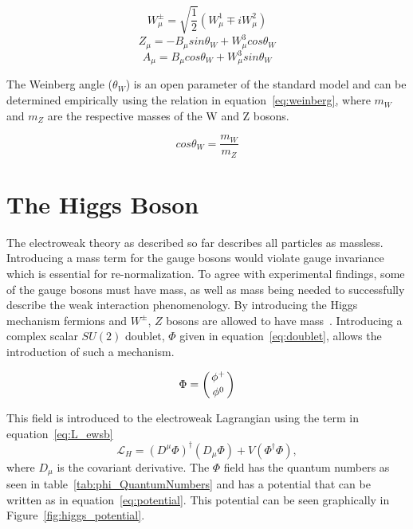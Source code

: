 \begin{equation} W^{\pm}_{\mu} = \sqrt{\dfrac{1}{2}}(W^1_{\mu} \mp iW^2_{\mu}) \label{eq:Ws}\end{equation}
\begin{equation} Z_{\mu} = -B_{\mu} sin \theta_W + W^3_{\mu} cos \theta_W \label{eq:Z}\end{equation}
\begin{equation} A_{\mu} = B_{\mu} cos \theta_W + W^3_{\mu} sin \theta_W \label{eq:gamma}\end{equation}

The Weinberg angle ($\theta_W$) is an open parameter of the standard model and can be determined empirically using the relation in equation~\ref{eq:weinberg}, where $m_W$ and $m_Z$ are the respective masses of the W and Z bosons. 

\begin{equation} cos \theta_W = \dfrac{m_W}{m_Z} \label{eq:weinberg}\end{equation}









\section{The Higgs Boson}

The electroweak theory as described so far describes all particles as massless.  Introducing a mass term for the gauge bosons would violate gauge invariance which is essential for re-normalization.  To agree with experimental findings, some of the gauge bosons must have mass, as well as mass being needed to successfully describe the weak interaction phenomenology. By introducing the Higgs mechanism fermions and $W^{\pm}$, $Z$ bosons are allowed to have mass~\cite{Dawson98}.   Introducing a complex scalar $S U(2)$ doublet, $\Phi$ given in equation~\ref{eq:doublet}, allows the introduction of such a mechanism.

\begin{equation} \Phi = \left( \genfrac{}{}{0pt}{}{\phi^+}{\phi^0}  \right) \label{eq:doublet}\end{equation}

This field is introduced to the electroweak Lagrangian using the term in equation~\ref{eq:L_ewsb} \begin{equation} \mathcal{L}_{H}  = (D^{\mu}\Phi)^{\dagger}(D_{\mu}\Phi) + V(\Phi^{\dagger} \Phi), \label{eq:L_ewsb}\end{equation} where $D_{\mu}$ is the covariant derivative. The $\Phi$ field has the quantum numbers as seen in table~\ref{tab:phi_QuantumNumbers} and has a potential that can be written as in equation~\ref{eq:potential}.  This potential can be seen graphically in Figure~\ref{fig:higgs_potential}.


